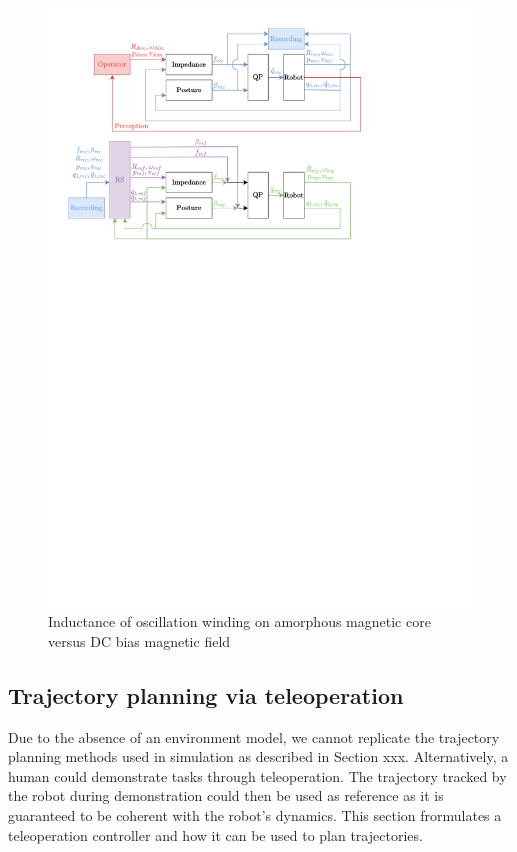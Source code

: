 \documentclass[a4paper, 10pt, conference]{ieeeconf}
\begin{document}
\begin{figure}[h]
    \includegraphics[trim={1cm 17.8cm 5cm 6.5cm}, clip]{Graphics/qp.pdf}
      \caption{Inductance of oscillation winding on amorphous
       magnetic core versus DC bias magnetic field}
      \label{figurelabel}
   \end{figure}

\lipsum[3-10]
    \subsection{Trajectory planning via teleoperation}
    Due to the absence of an environment model, we cannot replicate the trajectory planning methods used in simulation as described in Section xxx. Alternatively, a human could demonstrate tasks through teleoperation. The trajectory tracked by the robot during demonstration could then be used as reference as it is guaranteed to be coherent with the robot's dynamics. This section frormulates a teleoperation controller and how it can be used to plan trajectories.
\end{document}
